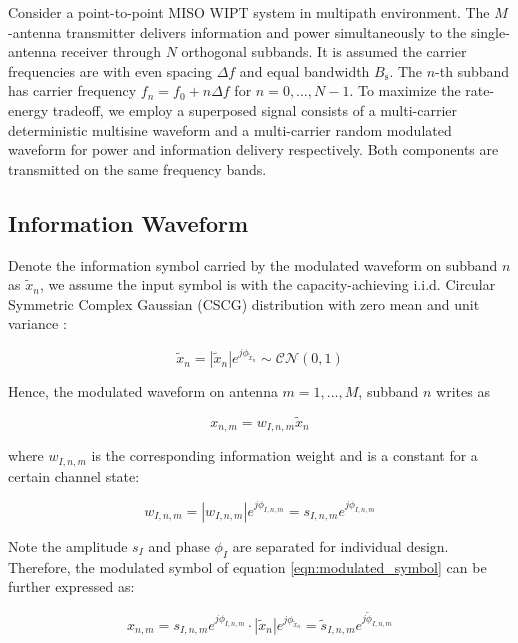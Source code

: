 Consider a point-to-point MISO WIPT system in multipath environment. The $M$-antenna transmitter delivers information and power simultaneously to the single-antenna receiver through $N$ orthogonal subbands. It is assumed the carrier frequencies are with even spacing $\Delta f$ and equal bandwidth ${B_{\text{s}}}$. The $n$-th subband has carrier frequency ${f_n} = {f_0} + n\Delta f$ for $n = 0, \ldots ,N - 1$. To maximize the rate-energy tradeoff, we employ a superposed signal consists of a multi-carrier deterministic multisine waveform and a multi-carrier random modulated waveform for power and information delivery respectively. Both components are transmitted on the same frequency bands.

\subsection{Information Waveform}
Denote the information symbol carried by the modulated waveform on subband $n$ as ${{\tilde x}_n}$, we assume the input symbol is with the capacity-achieving i.i.d. Circular Symmetric Complex Gaussian (CSCG) distribution with zero mean and unit variance \cite{Varasteh2017a}:

\begin{equation}\label{eqn:unmodulated_symbol}
  {{\tilde x}_n} = \left| {{{\tilde x}_n}} \right|{e^{j{\phi _{{{\tilde x}_n}}}}}\sim\mathcal{C}\mathcal{N}(0,1)
\end{equation}

Hence, the modulated waveform on antenna $m = 1, \ldots ,M$, subband $n$ writes as

\begin{equation}\label{eqn:modulated_symbol}
  {x_{n,m}} = {w_{I,n,m}}{{\tilde x}_n}
\end{equation}

where ${w_{I,n,m}}$ is the corresponding information weight and is a constant for a certain channel state:

\begin{equation}\label{eqn:weight_information}
  {w_{I,n,m}} = \left| {{w_{I,n,m}}} \right|{e^{j{\phi _{I,n,m}}}} = {s_{I,n,m}}{e^{j{\phi _{I,n,m}}}}
\end{equation}

Note the amplitude ${s_I}$ and phase ${\phi _I}$ are separated for individual design. Therefore, the modulated symbol of equation \ref{eqn:modulated_symbol} can be further expressed as:

\begin{equation}\label{eqn:modulated_symbol_further}
  {x_{n,m}} = {s_{I,n,m}}{e^{j{\phi _{I,n,m}}}} \cdot \left| {{{\tilde x}_n}} \right|{e^{j{\phi _{{{\tilde x}_n}}}}} = {{\tilde s}_{I,n,m}}{e^{j{{\tilde \phi }_{I,n,m}}}}
\end{equation}

